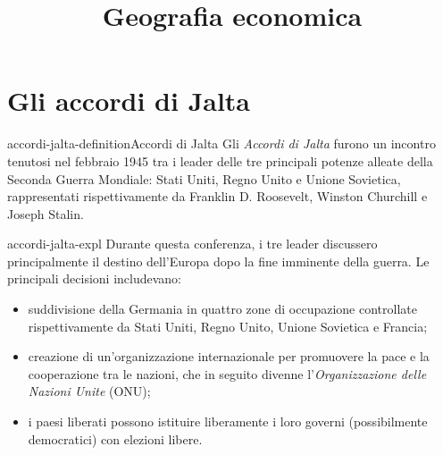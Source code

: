 \documentclass[preview]{standalone}
\begin{document}
\title{Geografia economica}
\genpage

\section{Gli accordi di Jalta}

\begin{snippetdefinition}{accordi-jalta-definition}{Accordi di Jalta}
    Gli \textit{Accordi di Jalta} furono un incontro tenutosi nel febbraio 1945 tra i leader delle tre principali potenze alleate della Seconda Guerra Mondiale: Stati Uniti, Regno Unito e Unione Sovietica, rappresentati rispettivamente da Franklin D. Roosevelt, Winston Churchill e Joseph Stalin.
\end{snippetdefinition}

\begin{snippet}{accordi-jalta-expl}
    Durante questa conferenza, i tre leader discussero principalmente il destino dell'Europa dopo la fine imminente della guerra. Le principali decisioni includevano:

    \begin{itemize}
        \item suddivisione della Germania in quattro zone di occupazione controllate rispettivamente
            da Stati Uniti, Regno Unito, Unione Sovietica e Francia;
        \item creazione di un'organizzazione internazionale per promuovere la pace e la cooperazione tra le nazioni, che in seguito divenne l'\textit{Organizzazione delle Nazioni Unite} (ONU);
        \item i paesi liberati possono istituire liberamente i loro governi (possibilmente democratici) con elezioni libere.
    \end{itemize}
\end{snippet}
\end{document}
